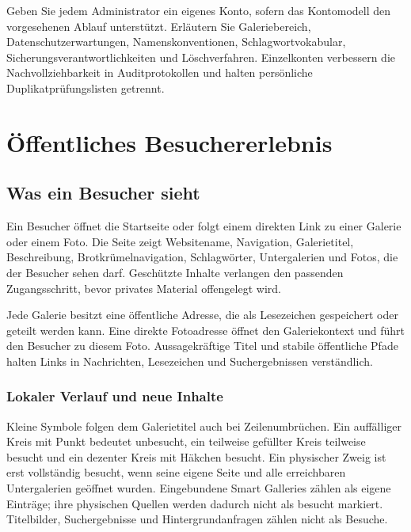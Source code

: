 \documentclass[11pt,a4paper]{article}
\begin{document}
Geben Sie jedem Administrator ein eigenes Konto, sofern das Kontomodell den
vorgesehenen Ablauf unterstützt. Erläutern Sie Galeriebereich,
Datenschutzerwartungen, Namenskonventionen, Schlagwortvokabular,
Sicherungsverantwortlichkeiten und Löschverfahren. Einzelkonten verbessern die
Nachvollziehbarkeit in Auditprotokollen und halten persönliche
Duplikatprüfungslisten getrennt.

\section{Öffentliches Besuchererlebnis}
\label{sec:public}

\subsection{Was ein Besucher sieht}

Ein Besucher öffnet die Startseite oder folgt einem direkten Link zu einer
Galerie oder einem Foto. Die Seite zeigt Websitename, Navigation, Galerietitel,
Beschreibung, Brotkrümelnavigation, Schlagwörter, Untergalerien und Fotos, die
der Besucher sehen darf. Geschützte Inhalte verlangen den passenden
Zugangsschritt, bevor privates Material offengelegt wird.

Jede Galerie besitzt eine öffentliche Adresse, die als Lesezeichen gespeichert
oder geteilt werden kann. Eine direkte Fotoadresse öffnet den Galeriekontext und
führt den Besucher zu diesem Foto. Aussagekräftige Titel und stabile öffentliche
Pfade halten Links in Nachrichten, Lesezeichen und Suchergebnissen verständlich.

\subsubsection{Lokaler Verlauf und neue Inhalte}

Kleine Symbole folgen dem Galerietitel auch bei Zeilenumbrüchen. Ein auffälliger
Kreis mit Punkt bedeutet unbesucht, ein teilweise gefüllter Kreis teilweise
besucht und
ein dezenter Kreis mit Häkchen besucht. Ein physischer Zweig ist erst
vollständig
besucht, wenn seine eigene Seite und alle erreichbaren Untergalerien geöffnet
wurden. Eingebundene Smart Galleries zählen als eigene Einträge; ihre
physischen Quellen werden dadurch nicht als besucht markiert. Titelbilder,
Suchergebnisse und Hintergrundanfragen zählen nicht als Besuche.
\end{document}
